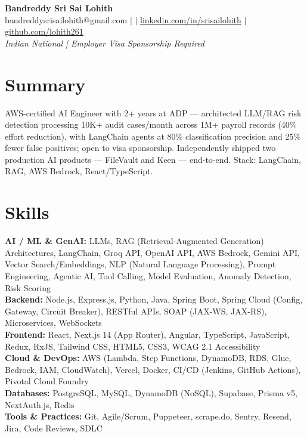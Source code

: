 \documentclass[10pt,letterpaper]{article}
\newcommand{\skillrow}[2]{\textbf{#1:} #2 \\[1pt]}
\begin{document}
\begin{center}
  {\Huge\bfseries Bandreddy Sri Sai Lohith}\\[3pt]
  \small bandreddysrisailohith@gmail.com $\vert$ $\vert$\; \href{https://linkedin.com/in/srisailohith}{linkedin.com/in/srisailohith} $\vert$\; \href{https://github.com/lohith261}{github.com/lohith261} \\[2pt]
  \small\textit{Indian National | Employer Visa Sponsorship Required}
\end{center}

\section{Summary}

AWS-certified AI Engineer with 2+ years at ADP --- architected LLM/RAG risk detection processing 10K+ audit cases/month across 1M+ payroll records (40\% effort reduction), with LangChain agents at 80\% classification precision and 25\% fewer false positives; open to visa sponsorship.
      Independently shipped two production AI products --- FileVault and Keen --- end-to-end. Stack: LangChain, RAG, AWS Bedrock, React/TypeScript.

\section{Skills}

\skillrow{AI / ML \& GenAI}{LLMs, RAG (Retrieval-Augmented Generation) Architectures, LangChain, Groq API, OpenAI API, AWS Bedrock, Gemini API, Vector Search/Embeddings, NLP (Natural Language Processing), Prompt Engineering, Agentic AI, Tool Calling, Model Evaluation, Anomaly Detection, Risk Scoring}
\skillrow{Backend}{Node.js, Express.js, Python, Java, Spring Boot, Spring Cloud (Config, Gateway, Circuit Breaker), RESTful APIs, SOAP (JAX-WS, JAX-RS), Microservices, WebSockets}
\skillrow{Frontend}{React, Next.js 14 (App Router), Angular, TypeScript, JavaScript, Redux, RxJS, Tailwind CSS, HTML5, CSS3, WCAG 2.1 Accessibility}
\skillrow{Cloud \& DevOps}{AWS (Lambda, Step Functions, DynamoDB, RDS, Glue, Bedrock, IAM, CloudWatch), Vercel, Docker, CI/CD (Jenkins, GitHub Actions), Pivotal Cloud Foundry}
\skillrow{Databases}{PostgreSQL, MySQL, DynamoDB (NoSQL), Supabase, Prisma v5, NextAuth.js, Redis}
\skillrow{Tools \& Practices}{Git, Agile/Scrum, Puppeteer, scrape.do, Sentry, Resend, Jira, Code Reviews, SDLC}
\end{document}
